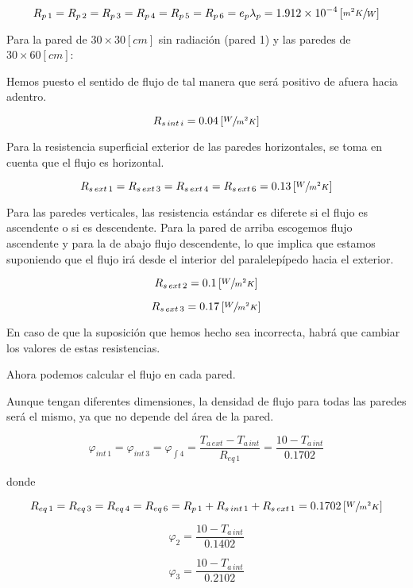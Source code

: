 \documentclass[12pt]{article}
\begin{document}
\[ R_{ p \, 1 } = R_{ p \, 2 } = R_{ p \, 3 } = R_{ p \, 4 } = R_{ p \, 5 } = R_{ p \, 6 } = e_p \lambda _p = 1.912 \times 10 ^{ -4 } \left[ \sfrac{ m ^2 K }{ W } \right] \]

Para la pared de $ 30 \times 30 \left[ cm \right] $ sin radiación (pared 1) y las paredes de $ 30 \times 60 \left[ cm \right] $: 

Hemos puesto el sentido de flujo de tal manera que será positivo de afuera hacia adentro.

\[ R_{ s \, int \, i } = 0.04 \left[ \sfrac{ W }{ m ^2 K } \right] \]

Para la resistencia superficial exterior de las paredes horizontales, se toma en cuenta que el flujo es horizontal.

\[ R_{ s \, ext \, 1 } = R_{ s \, ext \, 3 } = R_{ s \, ext \, 4 } = R_{ s \, ext \, 6 } = 0.13 \left[ \sfrac{ W }{ m ^2 K } \right] \]

Para las paredes verticales, las resistencia estándar es diferete si el flujo es ascendente o si es descendente. Para la pared de arriba escogemos flujo ascendente y para la de abajo flujo descendente, lo que implica que estamos suponiendo que el flujo irá desde el interior del paralelepípedo hacia el exterior.

\[ R_{ s \, ext \, 2 } = 0.1 \left[ \sfrac{ W }{ m^2 K } \right] \]

\[ R_{ s \, ext \, 3 } = 0.17 \left[ \sfrac{ W }{ m^2 K } \right] \]

En caso de que la suposición que hemos hecho sea incorrecta, habrá que cambiar los valores de estas resistencias.

Ahora podemos calcular el flujo en cada pared.

Aunque tengan diferentes dimensiones, la densidad de flujo para todas las paredes será el mismo, ya que no depende del área de la pared.

\[ \varphi _{ int \, 1 } = \varphi _{ int \, 3 } = \varphi _{ \int 4 } = \frac{ T_{ a \, ext } - T_{ a \, int } }{ R_{ eq \, 1 } } = \frac{ 10 - T_{ a \, int } }{ 0.1702 } \]

donde

\[ R_{ eq \, 1 } = R_{ eq \, 3 } = R_{ eq \, 4 } = R_{ eq \, 6 } = R_{ p \, 1 } + R_{ s \, int \, 1 } + R_{ s \, ext \, 1 } = 0.1702 \left[ \sfrac{ W }{ m ^2 K } \right] \]

\[ \varphi _2 = \frac{ 10 - T_{ a \, int } }{ 0.1402 } \]

\[ \varphi _3 = \frac{ 10 - T_{ a \, int } }{ 0.2102 } \]
\end{document}
